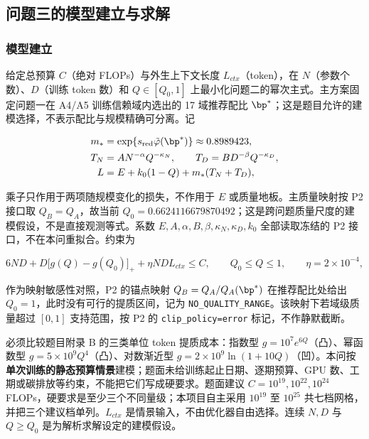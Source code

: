 \subsection{问题三的模型建立与求解}
\label{sec:5.4}

\subsubsection{模型建立}
\label{sec:5.4.1}

给定总预算 $C$（绝对 FLOPs）与外生上下文长度 $L_{ctx}$（token），在 $N$（参数个数）、$D$（训练 token 数）和 $Q\in[Q_0,1]$ 上最小化问题二的幂次主式。主方案固定问题一在 A4/A5 训练信赖域内选出的 17 域推荐配比 $\bp^*$；这是题目允许的建模选择，不表示配比与规模精确可分离。记

\begin{equation*}
\begin{aligned}
m_*&=\exp\{s_{\rm red}\tilde\varphi(\bp^*)\}\approx0.8989423,\\
T_N&=AN^{-\alpha}Q^{-\kappa_N},\qquad T_D=BD^{-\beta}Q^{-\kappa_D},\\
L&=E+k_0(1-Q)+m_*(T_N+T_D),
\end{aligned}
\end{equation*}

乘子只作用于两项随规模变化的损失，不作用于 $E$ 或质量地板。主质量映射按 P2 接口取 $Q_B=Q_A$，故当前 $Q_0=0.6624116679870492$；这是跨问题质量尺度的建模假设，不是直接观测等式。系数 $E,A,\alpha,B,\beta,\kappa_N,\kappa_D,k_0$ 全部读取冻结的 P2 接口，不在本问重拟合。约束为

\begin{equation*}
6ND+D\bigl[g(Q)-g(Q_0)\bigr]_++\eta NDL_{ctx}\le C,\qquad Q_0\le Q\le1,\qquad \eta=2\times10^{-4},
\end{equation*}

作为映射敏感性对照，P2 的锚点映射 $Q_B=Q_A/Q_A(\bp^*)$ 在推荐配比处给出 $Q_0=1$，此时没有可行的提质区间，记为 \texttt{NO\_QUALITY\_RANGE}。该映射下若域级质量超过 $[0,1]$ 支持范围，按 P2 的 \texttt{clip\_policy=error} 标记，不作静默截断。

必须比较题目附录 B 的三类单位 token 提质成本：指数型 $g=10^7e^{6Q}$（凸）、幂函数型 $g=5\times10^9Q^4$（凸）、对数渐近型 $g=2\times10^9\ln(1+10Q)$（凹）。本问按\textbf{单次训练的静态预算情景}建模；题面未给训练起止日期、逐期预算、GPU 数、工期或碳排放等约束，不能把它们写成硬要求。题面建议 $C=10^{19},10^{22},10^{24}$ FLOPs，硬要求是至少三个不同量级；本项目自主采用 $10^{19}$ 至 $10^{25}$ 共七档网格，并把三个建议档单列。$L_{ctx}$ 是情景输入，不由优化器自由选择。连续 $N,D$ 与 $Q\ge Q_0$ 是为解析求解设定的建模假设。

